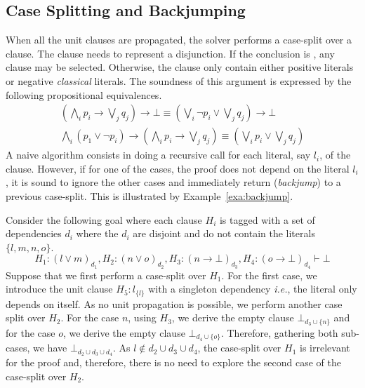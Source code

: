 \documentclass[utf8,a4paper,UKenglish,cleveref, autoref, thm-restate]{lipics-v2019}
\begin{document}
\subsection{Case Splitting and Backjumping}
\label{sec:case-split}

When all the unit clauses are propagated, the solver performs a
case-split over a clause. The clause needs to represent a
disjunction. If the conclusion is , any clause may be
selected. Otherwise, the clause only contain  either positive literals or  negative
\emph{classical} literals. The soundness of this argument is expressed by
the following propositional equivalences.
\[
  \begin{array}{l}
  (\bigwedge_i p_i \to \bigvee_j q_j) \to \bot \equiv (\bigvee_i \neg p_i \lor \bigvee_j q_j) \to \bot\\
    \bigwedge_i (p_1 \lor \neg p_i) \to (\bigwedge_i p_i \to \bigvee_j q_j) \equiv (\bigvee_i p_i \lor \bigvee_j q_j)
  \end{array}
\]
A naive algorithm consists in doing a recursive call for each literal,
say $l_i$, of the clause.  However, if for one of the cases, the proof
does not depend on the literal $l_i$, it is sound to ignore the other
cases and immediately return (\emph{backjump}) to a previous
case-split. This is illustrated by Example~\ref{exa:backjump}.
\begin{example}[Backjumping]
  \label{exa:backjump}
  Consider the following goal where each clause $H_i$ is tagged with a
  set of dependencies $d_i$ where the $d_i$ are disjoint and do not
  contain the literals $\{l,m,n,o\}$.
  \[
    H_1 : (l \lor m)_{d_1}, 
    H_2 : (n \lor o)_{d_2},
    H_3 : (n \to \bot)_{d_3},
    H_4 : (o \to \bot)_{d_4}
    \vdash \bot
\]
Suppose that we first perform a case-split over $H_1$.  For the first
case, we introduce the unit clause $H_5:l_{\{l\}}$ with a singleton
dependency \emph{i.e.}, the literal only depends on itself. As no unit
propagation is possible, we perform another case split over $H_2$.
For the case $n$, using $H_3$, we derive the empty clause
$\bot_{d_3 \cup \{n\}}$ and for the case $o$, we derive the empty
clause $\bot_{d_4 \cup \{o\}}$. Therefore, gathering both sub-cases,
we have $\bot_{d_2 \cup d_3 \cup d_4}$.  As
$l \notin d_2 \cup d_3 \cup d_4$, the case-split over $H_1$ is
irrelevant for the proof and, therefore, there is no need to explore
the second case of the case-split over $H_2$.
\end{example}
\end{document}
